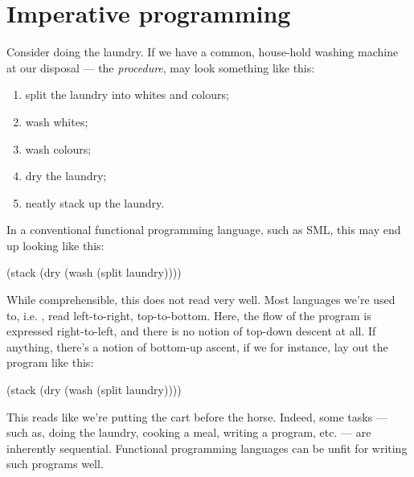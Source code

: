 \chapter{Imperative programming}

Consider doing the laundry. If we have a common, house-hold washing machine at
our disposal --- the \emph{procedure}, may look something like this:

\begin{enumerate}

\item split the laundry into whites and colours;

\item wash whites;

\item wash colours;

\item dry the laundry;

\item neatly stack up the laundry.

\end{enumerate}

In a conventional functional programming language, such as SML, this may end up
looking like this:

\begin{code}
(stack (dry (wash (split laundry))))
\end{code}

While comprehensible, this does not read very well. Most languages we're used
to, i.e. , read
left-to-right, top-to-bottom. Here, the flow of the program is expressed
right-to-left, and there is no notion of top-down descent at all. If anything,
there's a notion of bottom-up ascent, if we for instance, lay out the program
like this:

\begin{code}
(stack
  (dry
    (wash
      (split laundry))))
\end{code}

This reads like we're putting the cart before the horse. Indeed, some tasks ---
such as, doing the laundry, cooking a meal, writing a program, etc. --- are
inherently sequential. Functional programming languages can be
 unfit for writing such programs
well.

